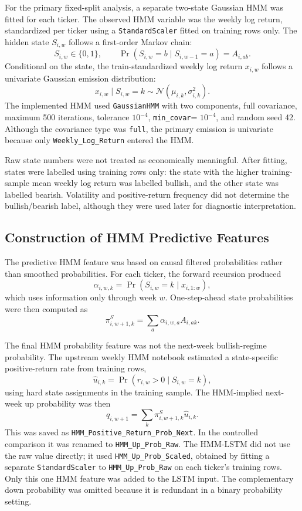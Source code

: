 For the primary fixed-split analysis, a separate two-state Gaussian HMM was fitted for each ticker. The observed HMM variable was the weekly log return, standardized per ticker using a \texttt{StandardScaler} fitted on training rows only. The hidden state \(S_{i,w}\) follows a first-order Markov chain:
\[
S_{i,w}\in\{0,1\}, \qquad
\Pr(S_{i,w}=b \mid S_{i,w-1}=a)=A_{i,ab}.
\]
Conditional on the state, the train-standardized weekly log return \(x_{i,w}\) follows a univariate Gaussian emission distribution:
\[
x_{i,w}\mid S_{i,w}=k \sim \mathcal{N}(\mu_{i,k},\sigma^2_{i,k}).
\]
The implemented HMM used \texttt{GaussianHMM} with two components, full covariance, maximum 500 iterations, tolerance \(10^{-4}\), \texttt{min\_covar}= \(10^{-4}\), and random seed 42. Although the covariance type was \texttt{full}, the primary emission is univariate because only \texttt{Weekly\_Log\_Return} entered the HMM.

Raw state numbers were not treated as economically meaningful. After fitting, states were labelled using training rows only: the state with the higher training-sample mean weekly log return was labelled bullish, and the other state was labelled bearish. Volatility and positive-return frequency did not determine the bullish/bearish label, although they were used later for diagnostic interpretation.

\subsection{Construction of HMM Predictive Features}

The predictive HMM feature was based on causal filtered probabilities rather than smoothed probabilities. For each ticker, the forward recursion produced
\[
\alpha_{i,w,k}=\Pr(S_{i,w}=k\mid x_{i,1:w}),
\]
which uses information only through week \(w\). One-step-ahead state probabilities were then computed as
\[
\pi^{S}_{i,w+1,k}=\sum_a \alpha_{i,w,a}A_{i,ak}.
\]

The final HMM probability feature was not the next-week bullish-regime probability. The upstream weekly HMM notebook estimated a state-specific positive-return rate from training rows,
\[
\hat{u}_{i,k}=\Pr(r_{i,w}>0\mid S_{i,w}=k),
\]
using hard state assignments in the training sample. The HMM-implied next-week up probability was then
\[
q_{i,w+1}=\sum_k \pi^{S}_{i,w+1,k}\hat{u}_{i,k}.
\]
This was saved as \texttt{HMM\_Positive\_Return\_Prob\_Next}. In the controlled comparison it was renamed to \texttt{HMM\_Up\_Prob\_Raw}. The HMM-LSTM did not use the raw value directly; it used \texttt{HMM\_Up\_Prob\_Scaled}, obtained by fitting a separate \texttt{StandardScaler} to \texttt{HMM\_Up\_Prob\_Raw} on each ticker's training rows. Only this one HMM feature was added to the LSTM input. The complementary down probability was omitted because it is redundant in a binary probability setting.

